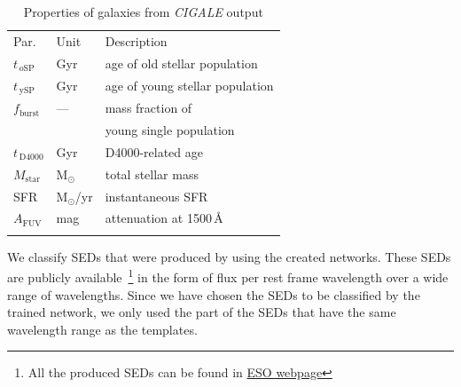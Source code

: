        
    \begin{table}
\caption{Properties of  galaxies from {\em CIGALE} output }   
\label{tab: props}
\centering
\begin{tabular}{l l l}
\hline\hline
\noalign{\smallskip}
Par. & Unit & Description\\
\noalign{\smallskip}
\hline
\noalign{\smallskip}
$t_{\,\mathrm{oSP}}$ & Gyr & age of old stellar population \\
$t_{\,\mathrm{ySP}}$ & Gyr & age of young stellar population \\
$f_\mathrm{burst}$ & --- & mass fraction of \\
& & young single population  \\
\noalign{\smallskip}
$t_{\,\mathrm{D4000}}$ & Gyr & D4000-related age \\
\noalign{\smallskip}
$M_\mathrm{star}$ & M$_\odot$ & total stellar mass  \\
SFR & M$_\odot$/yr & instantaneous SFR  \\
$A_\mathrm{FUV}$ & mag & attenuation at 1500\,\AA{} \\
\noalign{\smallskip}
\hline
\end{tabular}
\end{table}
    
    We classify SEDs that were produced by  using the created networks.
    These SEDs are publicly available~\footnote{All the  produced SEDs can be found in \href{http://telbib.eso.org/detail.php?bibcode=2012AJ....144..172T}{ESO webpage}} in the form of flux per rest frame wavelength over a wide range of wavelengths.
    Since we have chosen the  SEDs to be classified by the trained network, we only used the part of the SEDs that have the same wavelength range as the  templates. 
